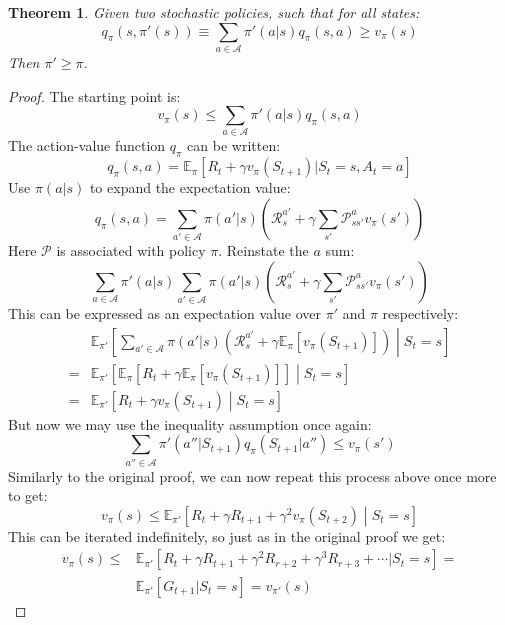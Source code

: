 \documentclass[12pt, a4paper]{article}
\newtheorem{theorem}{Theorem}[section]
\numberwithin{equation}{section}
\begin{document}
\begin{theorem}
Given two stochastic policies, such that for all states:
\begin{equation}
q_\pi(s,\pi'(s))\equiv\sum_{a\in\mathcal{A}}\pi'(a|s)q_\pi(s,a)\ge v_\pi(s)
\end{equation}
Then $\pi'\ge\pi$.
\end{theorem}
\begin{proof}
The starting point is:
\begin{equation}
v_\pi(s)\le\sum_{a\in\mathcal{A}}\pi'(a|s)q_\pi(s,a)
\end{equation}
The action-value function $q_\pi$ can be written:
\begin{equation}
q_\pi(s,a)=\mathbb{E}_\pi[R_t+\gamma v_\pi(S_{t+1})|S_t=s,A_t=a]
\end{equation}
Use $\pi(a|s)$ to expand the expectation value:
\begin{equation}
q_\pi(s,a)=\sum_{a'\in\mathcal{A}}\pi(a'|s)\left(\mathcal{R}^{a'}_s+\gamma\sum_{s'}\mathcal{P}^a_{ss'}v_\pi(s')\right)
\end{equation}
Here $\mathcal{P}$ is associated with policy $\pi$. Reinstate the $a$ sum:
\begin{equation}
\sum_{a\in\mathcal{A}}\pi'(a|s)\sum_{a'\in\mathcal{A}}\pi(a'|s)\left(\mathcal{R}^{a'}_s+\gamma\sum_{s'}\mathcal{P}^a_{ss'}v_\pi(s')\right)
\end{equation}
This can be expressed as an expectation value over $\pi'$ and $\pi$ respectively:
\begin{align}
&\mathbb{E}_{\pi'}\left[\sum_{a'\in\mathcal{A}}\pi(a'|s)\left(\mathcal{R}^{a'}_s+\gamma\mathbb{E}_\pi[v_\pi(S_{t+1})]\right)\middle|S_t=s\right]\\
=&\mathbb{E}_{\pi'}\left[\mathbb{E}_\pi\left[R_t+\gamma\mathbb{E}_\pi[v_\pi(S_{t+1})]\right]\middle|S_t=s\right]\\
=&\mathbb{E}_{\pi'}\left[R_t+\gamma v_\pi(S_{t+1})\middle|S_t=s\right]
\end{align}
But now we may use the inequality assumption once again:
\begin{equation}
\sum_{a''\in\mathcal{A}}\pi'(a''|S_{t+1})q_\pi(S_{t+1}|a'')\le v_\pi(s')
\end{equation}
Similarly to the original proof, we can now repeat this process above once more to get:
\begin{equation}
v_\pi(s)\le\mathbb{E}_{\pi'}\left[R_t+\gamma R_{t+1}+\gamma^2 v_\pi(S_{t+2})\middle|S_t=s\right]
\end{equation}
This can be iterated indefinitely, so just as in the original proof we get:
\begin{align}
v_\pi(s)\le&\mathbb{E}_{\pi'}[R_t+\gamma R_{t+1}+\gamma^2 R_{r+2}+\gamma^3 R_{r+3}+\cdots|S_t=s]=\\
&\mathbb{E}_{\pi'}[G_{t+1}|S_{t}=s]=v_{\pi'}(s)
\end{align}
\end{proof}
\end{document}
